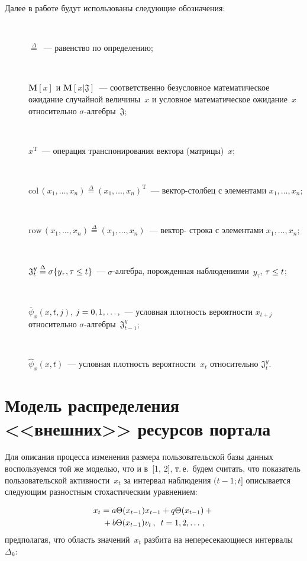 \begin{multicols}{2}
  Далее в работе будут использованы следующие обозначения:
  \begin{description}
  \item[\,] $\overset{\Delta}{=}$~--- равенство по определению;
\item[\,] $\mathbf{M}[x]$ и $\mathbf{M}[x\vert \mathfrak{J}]$~--- 
соответственно безусловное 
математическое ожидание случайной величины~$x$ и условное математическое 
ожидание~$x$ относительно $\sigma$-ал\-геб\-ры~$\mathfrak{J}$;
\item[\,] $x^{\mathrm{T}}$~--- операция транспонирования вектора (мат\-ри\-цы)~$x$;
\item[\,] $\mathrm{col}\,(x_1,\ldots ,x_n)\overset{\Delta}{=}(x_1,\ldots 
,x_n)^{\mathrm{T}}$~--- век\-тор-стол\-бец с 
элементами $x_1,\ldots ,x_n$;
\item[\,] $\mathrm{row}\,(x_1,\ldots ,x_n) \overset{\Delta}{=}(x_1,\ldots ,x_n)$~--- век\-тор-
стро\-ка с элементами  $x_1,\ldots ,x_n$;
\item[\,] $\mathfrak{J}_t^{y}\overset{\Delta}{=}\sigma\{y_\tau,\tau\hm\leq t\}$~--- 
$\sigma$-ал\-геб\-ра, порожденная наблюдениями~$y_\tau$, $\tau\hm\leq t$;
\item[\,] $\overline{\psi}_x(x,t,j)$, $j\hm=0, 1,\ldots ,$~--- условная плот\-ность вероятности 
$x_{t+j}$ относительно $\sigma$-ал\-геб\-ры~$\mathfrak{J}_{t-1}^y$;
\item[\,] $\hat{\psi}_x(x,t)$~--- условная плотность вероятности~$x_t$ относительно 
$\mathfrak{J}_t^y$.
\end{description}

\section{Модель распределения <<внешних>> ресурсов портала}
  
  Для описания процесса изменения размера пользовательской базы данных воспользуемся 
той же моделью, что и в~[1, 2], т.\,е.\ будем считать, что показатель пользовательской 
активности~$x_t$ за интервал наблюдения $(t-1;t]$ описывается следующим разностным 
стохастическим уравнением:

\noindent
  \begin{multline}
  x_t=a\Theta(x_{t-1})x_{t-1}+q\Theta(x_{t-1})+{}\\
  {}+b\Theta(x_{t-1})v_t\,,\enskip t=1,2, \ldots\,,
  \label{e1bos}
  \end{multline}
предполагая, что область значений~$x_t$ разбита на непересекающиеся интервалы 
$\Delta_k$:


\end{multicols}
